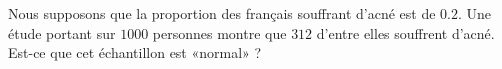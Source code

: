 
\begin{exercice}\label{exosmath-0328}

    Nous supposons que la proportion des français souffrant d'acné est de \( 0.2\). Une étude portant sur \( 1000\) personnes montre que \( 312\) d'entre elles souffrent d'acné. Est-ce que cet échantillon est «normal» ?

\end{exercice}

